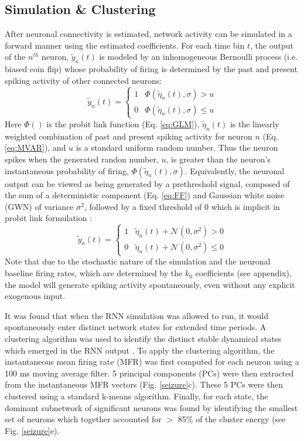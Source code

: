 \documentclass[11pt,a4paper,final]{article}
\begin{document}
\subsection{Simulation \& Clustering}
After neuronal connectivity is estimated, network activity can be simulated in a forward manner using the estimated coefficients.
For each time bin $t$, the output of the $n^{th}$ neuron, $\tilde{y}_n(t)$ is modeled by an inhomogeneous Bernoulli process (i.e. biased coin flip) whose probability of firing is determined by the past and present spiking activity of other connected neurons:
\begin{equation}
\tilde{y}_n(t) =
\begin{cases}
1   & \Phi(\tilde{\eta}_n(t),\sigma) > u        \\
0   & \Phi(\tilde{\eta}_n(t),\sigma) \leq u
\end{cases}
\label{eq:simul}
\end{equation}
Here $\Phi()$ is the probit link function (Eq. \ref{eq:GLM}), $\tilde{\eta}_n(t)$ is the linearly weighted combination of past and present spiking activity for neuron $n$ (Eq. \ref{eq:MVAR}), and $u$ is a standard uniform random number.
Thus the neuron spikes when the generated randon number, $u$, is greater than the neuron's instantaneous probability of firing, $\Phi(\tilde{\eta}_n(t),\sigma)$.
Equivalently, the neuronal output can be viewed as being generated by a prethreshold signal, composed of the sum of a deterministic component (Eq. \ref{eq:FF}) and Gaussian white noise (GWN) of variance $\sigma^2$, followed by a fixed threshold of 0 which is implicit in probit link formulation \citep{berger12}:
\begin{equation}
\tilde{y}_n(t) =
\begin{cases}
1   & \tilde{\eta}_n(t) + \mathcal{N}(0,\sigma^2) > 0        \\
0   & \tilde{\eta}_n(t) + \mathcal{N}(0,\sigma^2) \leq 0
\end{cases}
\label{eq:simul2}
\end{equation}
Note that due to the stochastic nature of the simulation and the neuronal baseline firing rates, which are determined by the $k_0$ coefficients (see appendix), the model will generate spiking activity spontaneously, even without any explicit exogenous input.

It was found that when the RNN simulation was allowed to run, it would spontaneously enter distinct network states for extended time periods.
A clustering algorithm was used to identify the distinct stable dynamical states which emerged in the RNN output \citep{sasaki07,santaniello14}.
To apply the clustering algorithm, the instantaneous mean firing rate (MFR) was first computed for each neuron using a 100 ms moving average filter.
5 principal components (PCs) were then extracted from the \nn{} instantaneous MFR vectors (Fig. \ref{seizure}c).
These 5 PCs were then clustered using a standard k-means algorithm.
Finally, for each state, the dominant subnetwork of significant neurons was found by identifying the smallest set of neurons which together accounted for $>$ 85\% of the cluster energy (see Fig. \ref{seizure}e).
\end{document}

